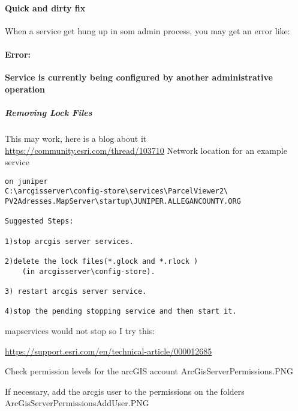 \paragraph*{Quick and dirty fix\texorpdfstring{\\}{}}

\noindent When a service get hung up in som admin process, you may get an error like:
\paragraph*{Error: \texorpdfstring{\\}{}}
\noindent \textbf{Service is currently being configured by another administrative operation}
\subparagraph[Remove Lock Files]{Removing Lock Files \texorpdfstring{\\}{}}
This may work, here is a blog about it\\
\href{https://community.esri.com/thread/103710}{https://community.esri.com/thread/103710}
Network location for an example service\\
\begin{verbatim}
on juniper
C:\arcgisserver\config-store\services\ParcelViewer2\
PV2Adresses.MapServer\startup\JUNIPER.ALLEGANCOUNTY.ORG

Suggested Steps:

1)stop arcgis server services.

2)delete the lock files(*.glock and *.rlock )
    (in arcgisserver\config-store).

3) restart arcgis server service.

4)stop the pending stopping service and then start it.
\end{verbatim}


mapservices would not stop so I try this:


\href{https://support.esri.com/en/technical-article/000012685}{https://support.esri.com/en/technical-article/000012685}


Check permission levels for the arcGIS account
ArcGisServerPermissions.PNG


If necessary, add the arcgis user to the permissions on the folders
ArcGisServerPermissionsAddUser.PNG



